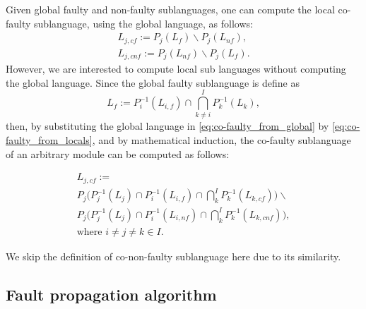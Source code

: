 
Given global faulty and non-faulty sublanguages, one can compute the local
co-faulty sublanguage, using the global language, as follows:
\begin{equation}
\label{eq:co-faulty_from_global}
	\begin{array}{l}
		L_{j,cf} := P_j(L_f) \backslash P_j(L_{nf}),\\ 
		L_{j,cnf} := P_j(L_{nf}) \backslash P_j(L_{f}).	
	\end{array}
\end{equation}
However, we are interested to compute local sub languages without computing the
global language. Since the global faulty sublanguage is define as
\begin{equation}
\label{eq:co-faulty_from_locals}
	L_f := P_i^{-1}(L_{i,f}) \cap \bigcap_{k\neq
	i}^I P_k^{-1}(L_k),
\end{equation}
then, by substituting the global language in \ref{eq:co-faulty_from_global} by
\ref{eq:co-faulty_from_locals}, and by mathematical induction, the co-faulty
sublanguage of an arbitrary module can be computed as follows:

\begin{equation}
\label{eq:co-faulty_iterative_w_faulty}
	\begin{array}{l}
		L_{j,cf} := 
		\\
		P_j\Big(P_j^{-1}(L_j) \cap P_i^{-1}(L_{i,f})\cap 
		\bigcap_k^I P_k^{-1}(L_{k,cf})\Big) \backslash 
		\\
		P_j\Big(P_j^{-1}(L_j) \cap P_i^{-1}(L_{i,nf})\cap 
		\bigcap_k^I P_k^{-1}(L_{k,cnf})\Big),
		\\ 
		\textrm{where } i\neq j\neq k \in I.
	\end{array}
\end{equation}

We skip the definition of co-non-faulty sublanguage here due to its similarity. 


\subsection{Fault propagation algorithm}

